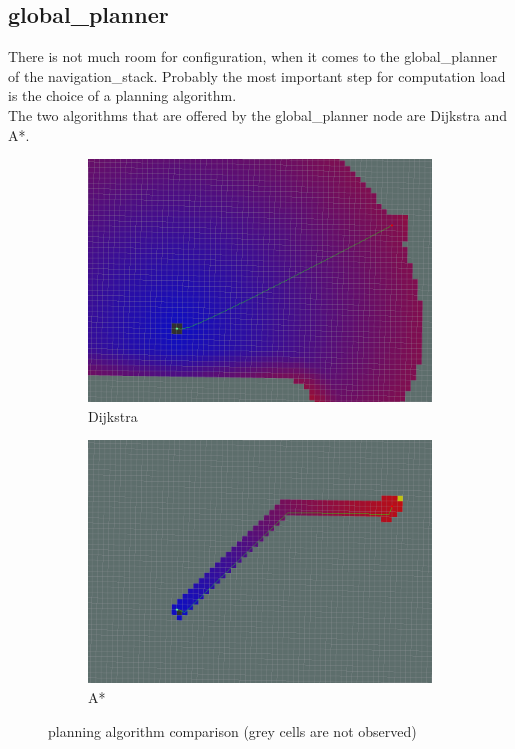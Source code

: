 \subsection{global\_planner}
There is not much room for configuration, when it comes to the global\_planner of the navigation\_stack. Probably the most important step for computation load is the choice of a planning algorithm.\\
The two algorithms that are offered by the global\_planner node are Dijkstra and A*.\\

\begin{figure}[H]
	\begin{subfigure}{.5\linewidth}
		\includegraphics[width=\textwidth]{Pictures/Dijkstra}
		\caption{Dijkstra}
	\end{subfigure}	
	\begin{subfigure}{.5\linewidth}
		\includegraphics[width=\textwidth]{Pictures/AStar2}
		\caption{A*}
	\end{subfigure}

	\caption{planning algorithm comparison (grey cells are not observed)\cite{globalplanner}}
	\label{plannercomparison}

\end{figure}


